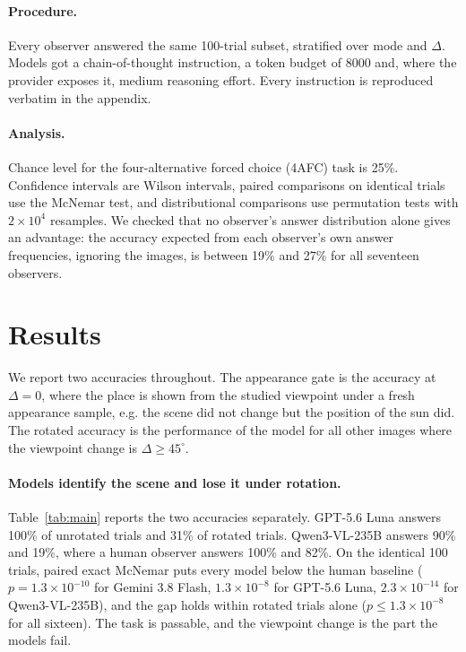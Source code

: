 \documentclass{article}
\begin{document}
\paragraph{Procedure.}
Every observer answered the same 100-trial subset, stratified over mode and $\Delta$. Models got a chain-of-thought instruction, a token budget of 8000 and, where the provider exposes it, medium reasoning effort. Every instruction is reproduced verbatim in the appendix.

\paragraph{Analysis.}
Chance level for the four-alternative forced choice (4AFC) task is 25\%. Confidence intervals are Wilson intervals, paired comparisons on identical trials use the McNemar test, and distributional comparisons use permutation tests with $2\times10^4$ resamples. We checked that no observer's answer distribution alone gives an advantage: the accuracy expected from each observer's own answer frequencies, ignoring the images, is between 19\% and 27\% for all seventeen observers.

\section{Results}

We report two accuracies throughout. The appearance gate is the accuracy at $\Delta=0$, where the place is shown from the studied viewpoint under a fresh appearance sample, e.g. the scene did not change but the position of the sun did. The rotated accuracy is the performance of the model for all other images where the viewpoint change is $\Delta\ge45^\circ$. 



\paragraph{Models identify the scene and lose it under rotation.}
Table~\ref{tab:main} reports the two accuracies separately. GPT-5.6 Luna answers 100\% of unrotated trials and 31\% of rotated trials. Qwen3-VL-235B answers 90\% and 19\%, where a human observer answers 100\% and 82\%. On the identical 100 trials, paired exact McNemar puts every model below the human baseline ($p=1.3\times10^{-10}$ for Gemini 3.8 Flash, $1.3\times10^{-8}$ for GPT-5.6 Luna, $2.3\times10^{-14}$ for Qwen3-VL-235B), and the gap holds within rotated trials alone ($p\le1.3\times10^{-8}$ for all sixteen). The task is passable, and the viewpoint change is the part the models fail.
\end{document}
